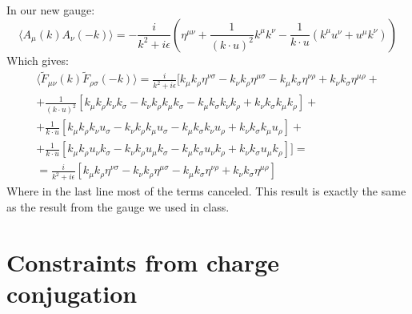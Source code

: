 \documentclass{article}
\begin{document}
In our new gauge:
\begin{equation}
    \langle A_\mu(k) A_\nu (-k) \rangle = -\frac{i}{k^2 + i\epsilon} \left(\eta^{\mu\nu} + \frac{1}{(k\cdot u)^2} k^{\mu}k^{\nu} - \frac{1}{k\cdot u} (k^{\mu}u^{\nu} + u^{\mu}k^{\nu})\right)
\end{equation}
Which gives:
\begin{equation}
\begin{gathered}
    \langle \tilde{F}_{\mu\nu}(k) \tilde{F}_{\rho\sigma}(-k) \rangle =
    \frac{i}{k^2 + i\epsilon} \Big[
        k_\mu k_\rho \eta^{\nu\sigma} - 
        k_\nu k_\rho \eta^{\mu\sigma} - 
        k_\mu k_\sigma \eta^{\nu\rho} + 
        k_\nu k_\sigma \eta^{\mu\rho} + \\ +
        \frac{1}{(k\cdot u)^2} \left[
            k_\mu k_\rho k_\nu k_\sigma - 
            k_\nu k_\rho k_\mu k_\sigma - 
            k_\mu k_\sigma k_\nu k_\rho + 
            k_\nu k_\sigma k_\mu k_\rho
        \right] + \\ +
        \frac{1}{k\cdot u} \left[
            k_\mu k_\rho k_\nu u_\sigma - 
            k_\nu k_\rho k_\mu u_\sigma - 
            k_\mu k_\sigma k_\nu u_\rho + 
            k_\nu k_\sigma k_\mu u_\rho
        \right] + \\ +
        \frac{1}{k\cdot u} \left[
            k_\mu k_\rho u_\nu k_\sigma - 
            k_\nu k_\rho u_\mu k_\sigma - 
            k_\mu k_\sigma u_\nu k_\rho + 
            k_\nu k_\sigma u_\mu k_\rho
        \right]
    \Big] = \\ =
    \frac{i}{k^2 + i\epsilon} \left[
        k_\mu k_\rho \eta^{\nu\sigma} - 
        k_\nu k_\rho \eta^{\mu\sigma} - 
        k_\mu k_\sigma \eta^{\nu\rho} + 
        k_\nu k_\sigma \eta^{\mu\rho}
    \right]
\end{gathered}
\end{equation}
Where in the last line most of the terms canceled. This result is exactly the same as the result from the gauge we used in class.

\newpage
\section{Constraints from charge conjugation}
\end{document}
